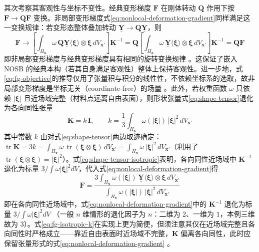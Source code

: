其次考察其客观性与坐标不变性。经典变形梯度 $\mathbf{F}$ 在刚体转动 $\mathbf{Q}$ 作用下按 $\mathbf{F}\to\mathbf{Q}\mathbf{F}$ 变换。非局部变形梯度式\eqref{eq:nonlocal-deformation-gradient}同样满足这一变换规律：若变形态整体叠加转动 $\underline{\mathbf{Y}}\to\mathbf{Q}\underline{\mathbf{Y}}$，则
\begin{equation}
  \mathbf{F}\to\left[\int_{H_{\mathbf{x}}}\omega\,\mathbf{Q}\underline{\mathbf{Y}}\langle\boldsymbol{\xi}\rangle\otimes\boldsymbol{\xi}\,dV_{\mathbf{x}'}\right]\mathbf{K}^{-1}
  =\mathbf{Q}\left[\int_{H_{\mathbf{x}}}\omega\,\underline{\mathbf{Y}}\langle\boldsymbol{\xi}\rangle\otimes\boldsymbol{\xi}\,dV_{\mathbf{x}'}\right]\mathbf{K}^{-1}
  =\mathbf{Q}\mathbf{F}
  \label{eq:fg-objective}
\end{equation}
即非局部变形梯度与经典变形梯度具有相同的旋转变换规律 \cite{Silling2007}。这保证了嵌入 NOSB 的经典本构（若其自身满足客观性）整体上保持客观性。进一步地，式\eqref{eq:fg-objective}的推导仅用了张量积与积分的线性性，不依赖坐标系的选取，故非局部变形梯度是坐标无关（coordinate-free）的场量 \cite{Silling2007,SillingLehoucq2010}。此外，若权重函数 $\omega$ 只依赖 $|\boldsymbol{\xi}|$ 且近场域完整（材料点远离自由表面），则形状张量式\eqref{eq:shape-tensor}退化为各向同性张量
\begin{equation}
  \mathbf{K}=k\,\mathbf{I},\qquad
  k=\frac{1}{3}\int_{H_{\mathbf{x}}}\omega(|\boldsymbol{\xi}|)\,|\boldsymbol{\xi}|^{2}\,dV_{\mathbf{x}'}
  \label{eq:shape-tensor-isotropic}
\end{equation}
其中常数 $k$ 由对式\eqref{eq:shape-tensor}两边取迹确定：$\operatorname{tr}\mathbf{K}=3k=\int_{H_{\mathbf{x}}}\omega\,\operatorname{tr}(\boldsymbol{\xi}\otimes\boldsymbol{\xi})\,dV_{\mathbf{x}'}=\int_{H_{\mathbf{x}}}\omega\,|\boldsymbol{\xi}|^{2}\,dV_{\mathbf{x}'}$（利用了 $\operatorname{tr}(\boldsymbol{\xi}\otimes\boldsymbol{\xi})=|\boldsymbol{\xi}|^{2}$）。式\eqref{eq:shape-tensor-isotropic}表明，各向同性近场域中 $\mathbf{K}^{-1}$ 退化为标量 $3/\int\omega|\boldsymbol{\xi}|^{2}dV$，代入式\eqref{eq:nonlocal-deformation-gradient}得
\begin{equation}
  \mathbf{F}=\frac{3\int_{H_{\mathbf{x}}}\omega(|\boldsymbol{\xi}|)\,
  \underline{\mathbf{Y}}\langle\boldsymbol{\xi}\rangle\otimes\boldsymbol{\xi}\,dV_{\mathbf{x}'}}
  {\int_{H_{\mathbf{x}}}\omega(|\boldsymbol{\xi}|)\,|\boldsymbol{\xi}|^{2}\,dV_{\mathbf{x}'}}
  \label{eq:fg-isotropic-k}
\end{equation}
即在各向同性近场域中，式\eqref{eq:nonlocal-deformation-gradient}中的 $\mathbf{K}^{-1}$ 退化为标量 $3/\int\omega|\boldsymbol{\xi}|^{2}dV$ \cite{Silling2007,QueirugaMoridis2017}（一般 $n$ 维情形的退化因子为 $n$：二维为 $2$、一维为 $1$，本例三维故为 $3$）。式\eqref{eq:fg-isotropic-k}在实现上更为简便，但须注意其仅在近场域完整且各向同性时严格成立——靠近自由表面时近场域不完整，$\mathbf{K}$ 偏离各向同性，此时应保留张量形式的式\eqref{eq:nonlocal-deformation-gradient} \cite{LeBobaru2018}。

